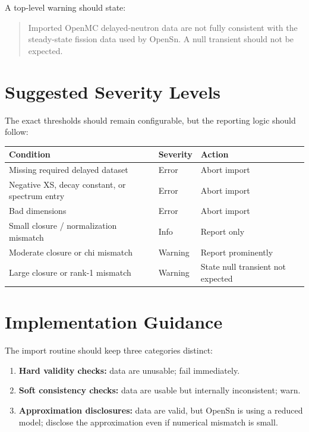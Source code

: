 \documentclass[11pt]{article}
\begin{document}
A top-level warning should state:

\begin{quote}
  Imported OpenMC delayed-neutron data are not fully consistent with the steady-state
  fission data used by OpenSn. A null transient should not be expected.
\end{quote}

\section{Suggested Severity Levels}

The exact thresholds should remain configurable, but the reporting logic should follow:

\begin{center}
\begin{tabular}{@{}lll@{}}
\toprule
Condition & Severity & Action \\
\midrule
Missing required delayed dataset & Error & Abort import \\
Negative XS, decay constant, or spectrum entry & Error & Abort import \\
Bad dimensions & Error & Abort import \\
Small closure / normalization mismatch & Info & Report only \\
Moderate closure or chi mismatch & Warning & Report prominently \\
Large closure or rank-1 mismatch & Warning & State null transient not expected \\
\bottomrule
\end{tabular}
\end{center}

\section{Implementation Guidance}

The import routine should keep three categories distinct:
\begin{enumerate}[label=\arabic*.]
  \item \textbf{Hard validity checks:} data are unusable; fail immediately.
  \item \textbf{Soft consistency checks:} data are usable but internally inconsistent; warn.
  \item \textbf{Approximation disclosures:} data are valid, but OpenSn is using a reduced model;
  disclose the approximation even if numerical mismatch is small.
\end{enumerate}
\end{document}
